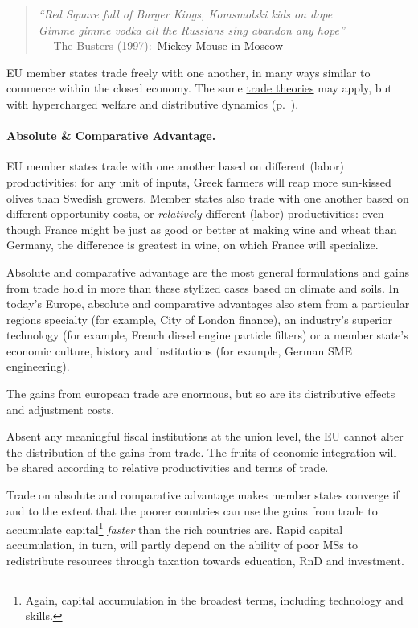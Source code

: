 \begin{verse}
	\emph{``Red Square full of Burger Kings, Komsmolski kids on dope \\
	Gimme gimme vodka all the Russians sing abandon any hope''\\}
	--- The Busters (1997):\ \href{http://www.youtube.com/watch?v=xsxRMOnpMTY}{Mickey Mouse in Moscow}\\
\end{verse}

\gls{EU} member states trade freely with one another, in many ways similar to commerce within the closed economy.
The same \hyperref[sec:space]{trade theories} may apply, but with hypercharged welfare and distributive dynamics (p.~\pageref{sec:space}).

\paragraph{Absolute \& Comparative Advantage.} \gls{EU} member states trade with one another based on different (labor) productivities:
for any unit of inputs, Greek farmers will reap more sun-kissed olives than Swedish growers.
Member states also trade with one another based on different opportunity costs, or \emph{relatively} different (labor) productivities:
even though France might be just as good or better at making wine and wheat than Germany, the difference is greatest in wine, on which France will specialize.

Absolute and comparative advantage are the most general formulations and gains from trade hold in more than these stylized cases based on climate and soils.
In today's Europe, absolute and comparative advantages also stem from a particular regions specialty (for example, City of London finance), an industry's superior technology (for example, French diesel engine particle filters) or a member state's economic culture, history and institutions (for example, German \gls{SME} engineering).

The gains from european trade are enormous, but so are its distributive effects and adjustment costs.

Absent any meaningful fiscal institutions at the union level, the \gls{EU} cannot alter the distribution of the gains from trade.
The fruits of economic integration will be shared according to relative productivities and terms of trade.

Trade on absolute and comparative advantage makes member states converge if and to the extent that the poorer countries can use the gains from trade to accumulate capital\footnote{
	Again, capital accumulation in the broadest terms, including technology and skills.}
\emph{faster} than the rich countries are.
Rapid capital accumulation, in turn, will partly depend on the ability of poor \glspl{MS} to redistribute resources through taxation towards education, \gls{RnD} and investment.

